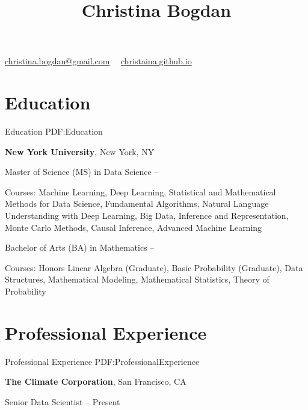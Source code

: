 \documentclass[letterpaper,9.5pt,oneside]{article}
\newcommand{\CVAuthor}{Christina Bogdan}
\begin{document}

\title{\CVAuthor}

\begin{subtitle}

\par
\href{mailto:christina.bogdan@gmail.com}
{christina.bogdan@gmail.com}
\, \SubBulletSymbol \, \url{christaina.github.io}
\end{subtitle}

\begin{body}


\section
{Education}
{Education}
{PDF:Education}


\textbf{New York University},
New York, NY

\GapNoBreak
Master of Science (MS) in
Data Science
\hfill
{} --
\begin{detail}
\BulletItem
Courses: Machine Learning, Deep Learning, Statistical and Mathematical Methods for Data Science, Fundamental Algorithms, Natural Language Understanding with Deep Learning, Big Data, Inference and Representation, Monte Carlo Methods, Causal Inference, Advanced Machine Learning
\end{detail}

\GapNoBreak
Bachelor of Arts (BA) in Mathematics
\hfill
{} --
\begin{detail}
\BulletItem
Courses: Honors Linear Algebra (Graduate), Basic Probability (Graduate), Data Structures, Mathematical Modeling, Mathematical Statistics, Theory of Probability
\end{detail}



\section
{Professional Experience}
{Professional Experience}
{PDF:ProfessionalExperience}


\textbf{The Climate Corporation},
San Francisco, CA

\GapNoBreak
Senior Data Scientist
\hfill
{} --
Present 
\begin{detail}
\end{detail}


\end{body}
\end{document}
